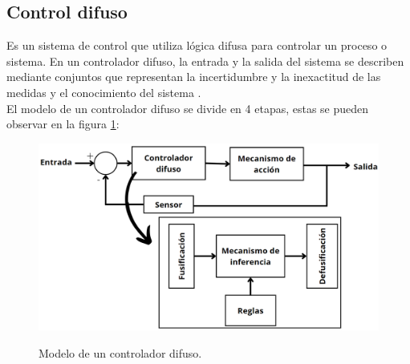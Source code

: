 \subsection{Control difuso}
Es un sistema de control que utiliza lógica difusa para controlar un proceso o sistema. En un controlador difuso, la entrada y la salida del sistema se describen mediante conjuntos que representan la incertidumbre y la inexactitud de las medidas y el conocimiento del sistema \cite{mamdani1975experiment}  \cite{ross2009fuzzy}.
\\
El modelo de un controlador difuso se divide en 4 etapas, estas se pueden observar en la figura \ref{difuso}:
\begin{figure}[!ht]
\centering
         \includegraphics[scale=0.36]{imgs/Diagramacontrol.png} \\
    \caption{Modelo de un controlador difuso.}\label{difuso}
\end{figure}
